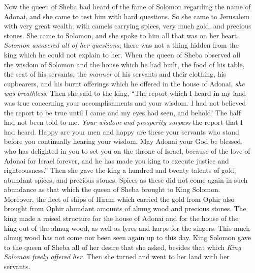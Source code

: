 \begin{biblechapter} %
 Now the queen of Sheba had heard of the fame of Solomon regarding the name of Adonai, and she came to test him with hard questions.
\verse So she came to Jerusalem with very great wealth; with camels carrying spices, very much gold, and precious stones. She came to Solomon, and she spoke to him all that was on her heart.
\verse \textit{Solomon answered all of her questions}; there was not a thing hidden from the king which he could not explain to her.
\verse When the queen of Sheba observed all the wisdom of Solomon and the house which he had built,
\verse the food of his table, the seat of his servants, the \textit{manner} of his servants and their clothing, his cupbearers, and his burnt offerings which he offered in the house of Adonai, \textit{she was breathless}.
\verse Then she said to the king, “The report which I heard in my land was true concerning your accomplishments and your wisdom.
\verse I had not believed the report to be true until I came and my eyes had seen, and behold! The half had not been told to me. \textit{Your wisdom and prosperity surpass} the report that I had heard.
\verse Happy are your men and happy are these your servants who stand before you continually hearing your wisdom.
\verse May Adonai your God be blessed, who has delighted in you to set you on the throne of Israel, because of the love of Adonai for Israel forever, and he has made you king to execute justice and righteousness.”
\verse Then she gave the king a hundred and twenty talents of gold, abundant spices, and precious stones. Spices as these did not come again in such abundance as that which the queen of Sheba brought to King Solomon.
\verse Moreover, the fleet of ships of Hiram which carried the gold from Ophir also brought from Ophir abundant amounts of almug wood and precious stones.
\verse The king made a raised structure for the house of Adonai and for the house of the king out of the almug wood, as well as lyres and harps for the singers. This much almug wood has not come nor been seen again up to this day.
\verse King Solomon gave to the queen of Sheba all of her desire that she asked, besides that which \textit{King Solomon freely offered her}. Then she turned and went to her land with her servants.

\end{biblechapter}
